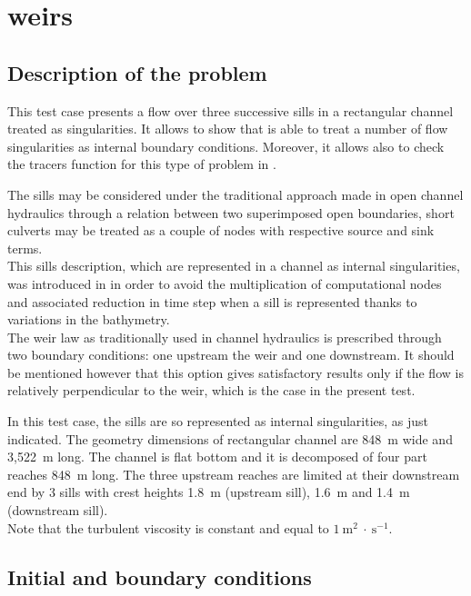 \chapter{weirs}

\section{Description of the problem}
\bigskip
This test case presents a flow over three successive sills in 
a rectangular channel treated as singularities. It allows to show 
that  is able to treat a number of flow singularities 
as internal boundary conditions. Moreover, it allows also to check 
the tracers function for this type of problem in .

\bigskip
The sills may be considered under the traditional approach made 
in open channel hydraulics through a relation between two superimposed 
open boundaries, short culverts may be treated as a couple of nodes
 with respective source and sink terms.\\
This sills description, which are represented in a channel as internal 
singularities, was introduced in  in order to avoid the 
multiplication of computational nodes and associated reduction in time 
step when a sill is represented thanks to variations in the bathymetry.\\
The weir law as traditionally used in channel hydraulics is prescribed 
through two boundary conditions: one upstream the weir and one downstream. 
It should be mentioned however that this option gives satisfactory results 
only if the flow is relatively perpendicular to the weir, which is 
the case in the present test.

\bigskip
In this test case, the sills  are so represented as internal 
singularities, as just indicated.
The geometry dimensions of rectangular channel are 848~m wide 
and  3,522~m long. The channel is flat bottom and it is decomposed 
of four part reaches 848~m long. The three upstream reaches are limited 
at their downstream end by 3 sills with crest heights 1.8~m (upstream sill), 
1.6~m and 1.4~m (downstream sill).\\
Note that the turbulent viscosity is constant and equal to $1~\text{m}^2~\cdot~\text{s}^{-1}$.

\section{Initial and boundary conditions}

